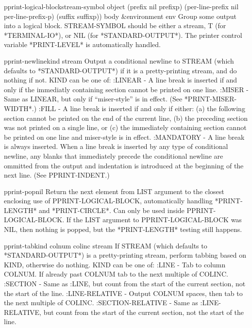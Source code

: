 \begin{macro}{pprint-logical-block}{stream-symbol object \key (prefix nil prefixp)
  (per-line-prefix nil per-line-prefix-p) (suffix  suffixp))
 \body body &environment env}{}
  Group some output into a logical block. STREAM-SYMBOL should be either a
   stream, T (for *TERMINAL-IO*), or NIL (for *STANDARD-OUTPUT*). The printer
   control variable *PRINT-LEVEL* is automatically handled.
\end{macro}

\begin{function}{pprint-newline}{kind \op stream}{}
  Output a conditional newline to STREAM (which defaults to
   *STANDARD-OUTPUT*) if it is a pretty-printing stream, and do
   nothing if not. KIND can be one of:
     :LINEAR - A line break is inserted if and only if the immediatly
        containing section cannot be printed on one line.
     :MISER - Same as LINEAR, but only if ``miser-style'' is in effect.
        (See *PRINT-MISER-WIDTH*.)
     :FILL - A line break is inserted if and only if either:
       (a) the following section cannot be printed on the end of the
           current line,
       (b) the preceding section was not printed on a single line, or
       (c) the immediately containing section cannot be printed on one
           line and miser-style is in effect.
     :MANDATORY - A line break is always inserted.
   When a line break is inserted by any type of conditional newline, any
   blanks that immediately precede the conditional newline are ommitted
   from the output and indentation is introduced at the beginning of the
   next line. (See PPRINT-INDENT.)
\end{function}

\begin{local-macro}{pprint-pop}{nil}{}
  Return the next element from LIST argument to the closest enclosing
   use of PPRINT-LOGICAL-BLOCK, automatically handling *PRINT-LENGTH*
   and *PRINT-CIRCLE*. Can only be used inside PPRINT-LOGICAL-BLOCK.
   If the LIST argument to PPRINT-LOGICAL-BLOCK was NIL, then nothing
   is popped, but the *PRINT-LENGTH* testing still happens.
\end{local-macro}

\begin{function}{pprint-tab}{kind colnum colinc \op stream}{}
  If STREAM (which defaults to *STANDARD-OUTPUT*) is a pretty-printing
   stream, perform tabbing based on KIND, otherwise do nothing. KIND can
   be one of:
     :LINE - Tab to column COLNUM. If already past COLNUM tab to the next
       multiple of COLINC.
     :SECTION - Same as :LINE, but count from the start of the current
       section, not the start of the line.
     :LINE-RELATIVE - Output COLNUM spaces, then tab to the next multiple of
       COLINC.
     :SECTION-RELATIVE - Same as :LINE-RELATIVE, but count from the start
       of the current section, not the start of the line.
\end{function}


